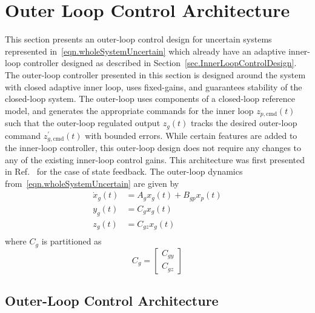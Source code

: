 \documentclass[journal]{IEEEtran}
\theoremstyle{innercustomthm}
\begin{document}
  \section{Outer Loop Control Architecture}\label{sec.outerloop}

  This section presents an outer-loop control design for uncertain systems represented in\ \eqref{eqn.wholeSystemUncertain} which already have an adaptive inner-loop controller designed as described in Section~\ref{sec.InnerLoopControlDesign}.
  The outer-loop controller presented in this section is designed around the system with closed adaptive inner loop, uses fixed-gains, and guarantees stability of the closed-loop system.
  The outer-loop uses components of a closed-loop reference model, and generates the appropriate commands for the inner loop $z_{p,\text{cmd}}(t)$ such that the outer-loop regulated output $z_{g}(t)$ tracks the desired outer-loop command $z_{g,\text{cmd}}^{\prime}(t)$ with bounded errors.
  While certain features are added to the inner-loop controller, this outer-loop design does not require any changes to any of the existing inner-loop control gains.
  This architecture was first presented in Ref.\ \cite{wiese.sequential.2016} for the case of state feedback.
  The outer-loop dynamics from\ \eqref{eqn.wholeSystemUncertain} are given by
  \begin{equation}
    \label{eqn.outerLoopDynamics}
    \begin{split}
      \dot{x}_{g}(t) &= A_{g}x_{g}(t) + B_{gp}x_{p}(t) \\
      y_{g}(t) &= C_{g}x_{g}(t) \\
      z_{g}(t) &= C_{gz}x_{g}(t) \\
    \end{split}
  \end{equation}
  where $C_{g}$ is partitioned as
  \begin{equation}
    \label{eqn.Cg}
    C_{g} =
    \begin{bmatrix}
      C_{gy} \\
      C_{gz}
    \end{bmatrix}
  \end{equation}


  \subsection{Outer-Loop Control Architecture}
\end{document}
